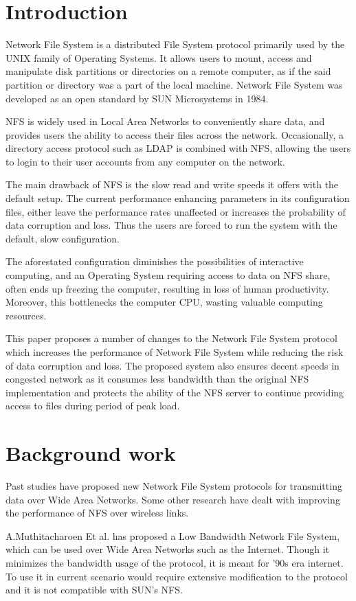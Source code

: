 \documentclass[conference]{IEEEtran}
\begin{document}
\section{Introduction}
Network File System is a distributed File System protocol primarily used by the  
UNIX family of Operating Systems. It allows users to mount, access and
manipulate disk partitions or directories on a remote computer, as if the
said partition or directory was a part of the local machine. Network File
System was developed as an open standard by SUN Microsystems in 1984\cite{b1}.

NFS is widely used in Local Area Networks to conveniently share data, and
provides users the ability to access their files across the network.
Occasionally, a directory access protocol such as LDAP is combined with NFS,
allowing the users to login to their user accounts from any computer on the 
network.

The main drawback of NFS is the slow read and write speeds it offers with 
the default setup. The current performance enhancing parameters in its 
configuration files, either leave the performance rates unaffected or 
increases the probability of data corruption and loss. Thus the users are 
forced to run the system with the default, slow configuration.

The aforestated configuration diminishes the possibilities of interactive 
computing, and an Operating System requiring access to data on NFS share, 
often ends up freezing the computer, resulting in loss of human productivity.
Moreover, this bottlenecks the computer CPU, wasting valuable computing 
resources. 

This paper proposes a number of changes to the Network File System protocol
which increases the performance of Network File System while reducing
the risk of data corruption and loss. The proposed system also ensures
decent speeds in congested network as it consumes less bandwidth than the 
original NFS implementation and protects the ability of the NFS server to
continue providing access to files during period of peak load.

\section{Background work}
Past studies have proposed new Network File System protocols for
transmitting data over Wide Area Networks. Some other research have dealt
with improving the performance of NFS over wireless links.

A.Muthitacharoen Et al. has proposed a Low Bandwidth Network File System\cite{b2},
which can be used over Wide Area Networks such as the Internet. Though it
minimizes the bandwidth usage of the protocol, it is meant for '90s
era internet. To use it in current scenario would require extensive 
modification to the protocol and it is not compatible with SUN's NFS.
\end{document}
